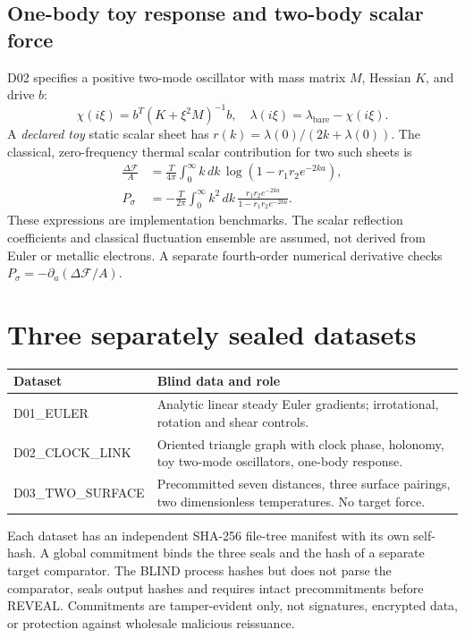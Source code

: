 \documentclass[10pt,a4paper]{article}
\begin{document}
\subsection{One-body toy response and two-body scalar force}
D02 specifies a positive two-mode oscillator with mass matrix $M$, Hessian $K$, and drive $b$:
\begin{equation}
\chi(i\xi)=b^T(K+\xi^2M)^{-1}b,\quad
\lambda(i\xi)=\lambda_{\mathrm{bare}}-\chi(i\xi).
\end{equation}
A \emph{declared toy} static scalar sheet has $r(k)=\lambda(0)/(2k+\lambda(0))$. The classical, zero-frequency thermal scalar contribution for two such sheets is
\begin{align}
\frac{\Delta\mathcal F}{A}&=\frac{T}{4\pi}\int_0^\infty k\,dk\,\log(1-r_1r_2e^{-2ka}),\\
P_\sigma&=-\frac{T}{2\pi}\int_0^\infty k^2\,dk\,\frac{r_1r_2e^{-2ka}}{1-r_1r_2e^{-2ka}}.
\end{align}
These expressions are implementation benchmarks. The scalar reflection coefficients and classical fluctuation ensemble are assumed, not derived from Euler or metallic electrons. A separate fourth-order numerical derivative checks $P_\sigma=-\partial_a(\Delta\mathcal F/A)$.

\section{Three separately sealed datasets}
\begin{center}
\begin{tabular}{@{}p{38mm}p{95mm}@{}}\toprule
Dataset & Blind data and role\\\midrule
D01\_EULER & Analytic linear steady Euler gradients; irrotational, rotation and shear controls.\\
D02\_CLOCK\_LINK & Oriented triangle graph with clock phase, holonomy, toy two-mode oscillators, one-body response.\\
D03\_TWO\_SURFACE & Precommitted seven distances, three surface pairings, two dimensionless temperatures. No target force.\\\bottomrule
\end{tabular}
\end{center}
Each dataset has an independent SHA-256 file-tree manifest with its own self-hash. A global commitment binds the three seals and the hash of a separate target comparator. The BLIND process hashes but does not parse the comparator, seals output hashes and requires intact precommitments before REVEAL. Commitments are tamper-evident only, not signatures, encrypted data, or protection against wholesale malicious reissuance.
\end{document}
